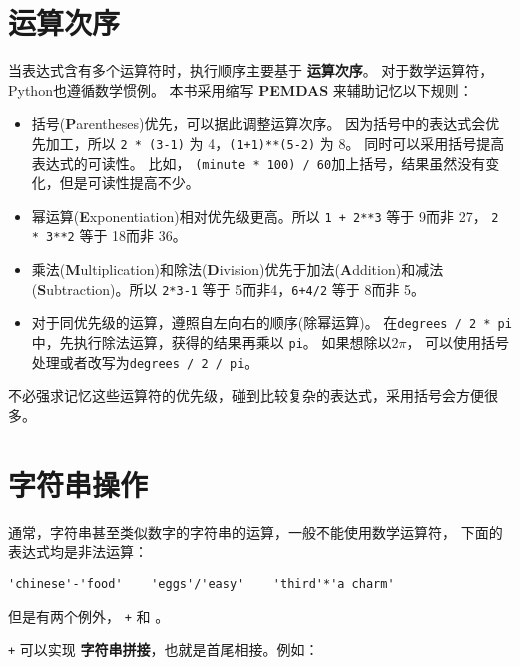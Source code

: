 \documentclass[10pt]{book}
\begin{document}
\section{运算次序}

当表达式含有多个运算符时，执行顺序主要基于 {\bf 运算次序}。
对于数学运算符，Python也遵循数学惯例。
本书采用缩写 {\bf PEMDAS} 来辅助记忆以下规则：

\begin{itemize}

\item 括号({\bf P}arentheses)优先，可以据此调整运算次序。
因为括号中的表达式会优先加工，所以 {\tt 2 * (3-1)} 为 4，{\tt (1+1)**(5-2)} 为 8。
同时可以采用括号提高表达式的可读性。
比如， {\tt (minute * 100) / 60}加上括号，结果虽然没有变化，但是可读性提高不少。

\item 幂运算({\bf E}xponentiation)相对优先级更高。所以
{\tt 1 + 2**3} 等于 9而非 27， {\tt 2 * 3**2} 等于 18而非 36。

\item 乘法({\bf M}ultiplication)和除法({\bf D}ivision)优先于加法({\bf A}ddition)和减法({\bf S}ubtraction)。所以 {\tt 2*3-1} 等于 5而非4，{\tt 6+4/2} 等于 8而非 5。

\item 对于同优先级的运算，遵照自左向右的顺序(除幂运算)。
 在{\tt degrees / 2 * pi}中，先执行除法运算，获得的结果再乘以 {\tt pi}。
如果想除以$2 \pi$， 可以使用括号处理或者改写为{\tt degrees / 2 / pi}。

\end{itemize}

不必强求记忆这些运算符的优先级，碰到比较复杂的表达式，采用括号会方便很多。


\section{字符串操作}

通常，字符串甚至类似数字的字符串的运算，一般不能使用数学运算符，
下面的表达式均是非法运算：

\begin{verbatim}
'chinese'-'food'    'eggs'/'easy'    'third'*'a charm'
\end{verbatim}
%

但是有两个例外， {\tt +} 和 {\tt *}。

 {\tt +} 可以实现 {\bf 字符串拼接}，也就是首尾相接。例如：
\end{document}

